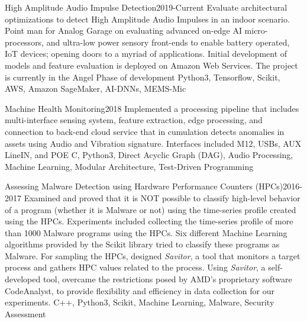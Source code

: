 %
%
%

\emptySeparator
{}
\begin{projects}
	\project
	{High Amplitude Audio Impulse Detection}{2019-Current}
	{}
	{Evaluate architectural optimizations to detect High Amplitude Audio Impulses in an indoor scenario. Point man for Analog Garage on evaluating advanced on-edge AI micro-processors, and ultra-low power sensory front-ends to enable battery operated, IoT devices; opening doors to a myriad of applications. Initial development of models and feature evaluation is deployed on Amazon Web Services. The project is currently in the Angel Phase of development}
	{Python3, Tensorflow, Scikit, AWS, Amazon SageMaker, AI-DNNs, MEMS-Mic}

	\project
	{Machine Health Monitoring}{2018}
	{}
	{Implemented a processing pipeline that includes multi-interface sensing system, feature extraction, edge processing, and connection to back-end cloud service that in cumulation detects anomalies in assets using Audio and Vibration signature. Interfaces included M12, USBs, AUX LineIN, and POE}
	{C, Python3, Direct Acyclic Graph (DAG), Audio Processing, Machine Learning, Modular Architecture, Test-Driven Programming}

	\project
	{Assessing Malware Detection using Hardware Performance Counters (HPCs)}{2016-2017}
	{}
	{Examined and proved that it is NOT possible to classify high-level behavior of a program (whether it is Malware or not) using the time-series profile created using the HPCs. Experiments included collecting the time-series profile of more than 1000 Malware programs using the HPCs. Six different Machine Learning algorithms provided by the Scikit library tried to classify these programs as Malware. For sampling the HPCs, designed \textit{Savitor}, a tool that monitors a target process and gathers HPC values related to the process. Using \textit{Savitor}, a self-developed tool, overcame the restrictions posed by AMD’s proprietary software CodeAnalyst, to provide flexibility and efficiency in data collection for our experiments.}
	{C++, Python3, Scikit, Machine Learning, Malware, Security Assessment}


\end{projects}
